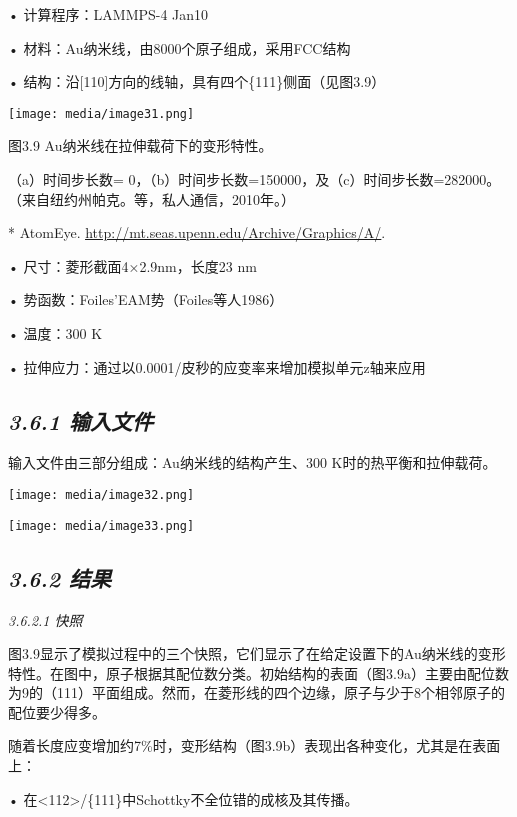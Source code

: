 \documentclass[
]{article}
\begin{document}
• 计算程序：LAMMPS-4 Jan10

• 材料：Au纳米线，由8000个原子组成，采用FCC结构

• 结构：沿{[}110{]}方向的线轴，具有四个\{111\}侧面（见图3.9）

\texttt{[image: media/image31.png]}

图3.9 Au纳米线在拉伸载荷下的变形特性。

（a）时间步长数=
0，（b）时间步长数=150000，及（c）时间步长数=282000。（来自纽约州帕克。等，私人通信，2010年。）

* AtomEye.
\href{http://mt.seas.upenn.edu/Archive/Graphics/A/}{\underline{http://mt.seas.upenn.edu/Archive/Graphics/A/}}.

• 尺寸：菱形截面4×2.9nm，长度23 nm

• 势函数：Foiles'EAM势（Foiles等人1986）

• 温度：300 K

• 拉伸应力：通过以0.0001/皮秒的应变率来增加模拟单元z轴来应用

\hypertarget{ux8f93ux5165ux6587ux4ef6-4}{%
\subsection{\texorpdfstring{\emph{3.6.1
输入文件}}{3.6.1 输入文件}}\label{ux8f93ux5165ux6587ux4ef6-4}}

输入文件由三部分组成：Au纳米线的结构产生、300 K时的热平衡和拉伸载荷。

\texttt{[image: media/image32.png]}

\texttt{[image: media/image33.png]}

\hypertarget{ux7ed3ux679c-5}{%
\subsection{\texorpdfstring{\emph{3.6.2
结果}}{3.6.2 结果}}\label{ux7ed3ux679c-5}}

\emph{3.6.2.1 快照}

图3.9显示了模拟过程中的三个快照，它们显示了在给定设置下的Au纳米线的变形特性。在图中，原子根据其配位数分类。初始结构的表面（图3.9a）主要由配位数为9的（111）平面组成。然而，在菱形线的四个边缘，原子与少于8个相邻原子的配位要少得多。

随着长度应变增加约7\%时，变形结构（图3.9b）表现出各种变化，尤其是在表面上：

• 在\textless112\textgreater/\{111\}中Schottky不全位错的成核及其传播。
\end{document}

